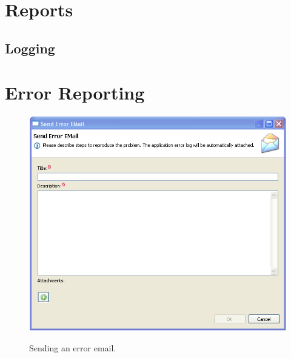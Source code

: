 \chapter{Reports}
\label{chap:reports}
\section{Logging}

\chapter{Error Reporting}
\label{chap:error_reporting}

\begin{figure}[H]
  \centering
  \scalebox{0.5}
	   { \includegraphics*{screenshots/error_reporting/send_error_email} }
	   \caption{Sending an error email.}
	   \label{fig:error_email}
\end{figure}
